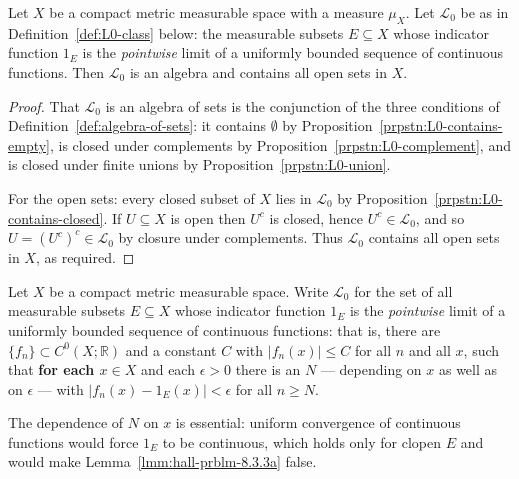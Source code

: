 \begin{lemma}
    \label{lmm:hall-prblm-8.3.3a}
    \leanok
    Let $X$ be a compact metric measurable space with a measure $\mu_X$. Let $\mathcal{L}_0$ be as in Definition~\ref{def:L0-class} below: the measurable subsets $E \subseteq X$ whose indicator function $1_E$ is the \textit{pointwise} limit of a uniformly bounded sequence of continuous functions. Then $\mathcal{L}_0$ is an algebra and contains all open sets in $X$.
\end{lemma}
\begin{proof}
    \leanok
That $\mathcal{L}_0$ is an algebra of sets is the conjunction of the three conditions of Definition~\ref{def:algebra-of-sets}: it contains $\emptyset$ by Proposition~\ref{prpstn:L0-contains-empty}, is closed under complements by Proposition~\ref{prpstn:L0-complement}, and is closed under finite unions by Proposition~\ref{prpstn:L0-union}.

For the open sets: every closed subset of $X$ lies in $\mathcal{L}_0$ by Proposition~\ref{prpstn:L0-contains-closed}. If $U \subseteq X$ is open then $U^c$ is closed, hence $U^c \in \mathcal{L}_0$, and so $U = (U^c)^c \in \mathcal{L}_0$ by closure under complements. Thus $\mathcal{L}_0$ contains all open sets in $X$, as required.
\end{proof}

\begin{definition}
    \label{def:L0-class}
    \leanok
    Let $X$ be a compact metric measurable space. Write $\mathcal{L}_0$ for the set of all measurable subsets $E \subseteq X$ whose indicator function $1_E$ is the \textit{pointwise} limit of a uniformly bounded sequence of continuous functions: that is, there are $\{f_n\} \subset C^0(X;\mathbb{R})$ and a constant $C$ with $\lvert f_n(x) \rvert \le C$ for all $n$ and all $x$, such that \textbf{for each $x \in X$} and each $\epsilon > 0$ there is an $N$ — depending on $x$ as well as on $\epsilon$ — with $\lvert f_n(x) - 1_E(x) \rvert < \epsilon$ for all $n \ge N$.

    The dependence of $N$ on $x$ is essential: uniform convergence of continuous functions would force $1_E$ to be continuous, which holds only for clopen $E$ and would make Lemma~\ref{lmm:hall-prblm-8.3.3a} false.
\end{definition}


